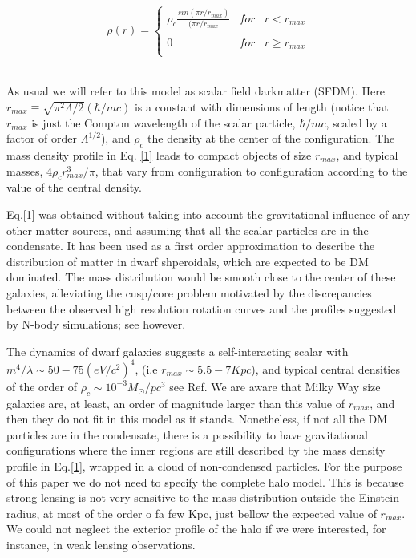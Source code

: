 \documentclass[15pt]{IEEEtran}
\begin{document}
\begin{equation}\tag{1}\label{1}
\rho(r)= \left\{ \begin{array}{lcc}
             \rho_c\frac{sin(\pi r/r_{max})}{(\pi r / r_{max}}  & for & r<r_{max}\\
             \\ 0 & for &  r\geq r_{max} \\ 
             \end{array}
   \right.
\end{equation}\\
\par
As usual we will refer to this model as scalar field darkmatter (SFDM). Here \(r_{max} \equiv \sqrt{\pi^2\Lambda/2} (\hbar/mc)\) is a constant with dimensions of length (notice that \(r_{max}\) is just the Compton  wavelength  of  the  scalar  particle, \(\hbar/mc\), scaled by a factor of order \(\Lambda^{1/2}\)), and \(\rho_c\) the density at the center of the configuration.  The mass density profile in Eq. \eqref{1} leads to compact objects of size \(r_{max}\), and typical masses, \(4\rho_c r^3_{max}/\pi\), that vary from configuration to configuration according to the value of the central density.\\
\par
Eq.\eqref{1} was obtained without taking into account the gravitational influence of any other matter sources, and assuming that all the scalar particles are in the condensate.  It has been used as a first order approximation to describe the distribution of matter in dwarf shperoidals, which are expected to be DM dominated\cite{PhysRevD.68.023511}.  The mass distribution would be smooth close to the center of these galaxies, alleviating the cusp/core problem motivated by the  discrepancies  between  the  observed  high  resolution rotation curves and the profiles suggested by N-body simulations\cite{9}; see however\cite{10}.\\
\par
The   dynamics   of   dwarf   galaxies   suggests   a   self-interacting  scalar with \(m^4/\lambda \sim 50-75(eV/c^2)^4\), (i.e \(r_{max} \sim 5.5-7Kpc\)), and typical central densities of the order of \(\rho_c \sim 10^{-3}M_\odot/pc^3\)  see Ref\cite{PhysRevD.68.023511}.  We are aware that  Milky  Way  size  galaxies  are,  at  least,  an  order  of magnitude larger than this value of \(r_{max}\), and then they do  not fit  in  this  model  as  it  stands.   Nonetheless,  if not all the DM particles are in the condensate, there is a  possibility  to  have  gravitational  configurations  where the inner regions are still described by the mass density profile in Eq.\eqref{1}, wrapped in a cloud of non-condensed particles.  For the purpose of this paper we do not need to specify the complete halo model.  This is because strong lensing is not very sensitive to the mass distribution outside the Einstein radius, at most of the order o fa few Kpc, just bellow the expected value of \(r_{max}\).  We could not neglect the exterior profile of the halo if we were interested, for instance, in weak lensing observations.
\end{document}
